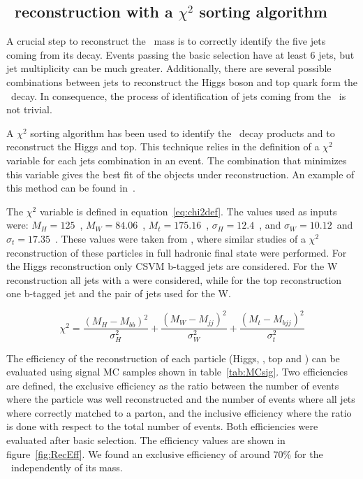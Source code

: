 \subsection{\Tp~reconstruction with a $\chi^{2}$ sorting algorithm}
\label{sec:chi2}

A crucial step to reconstruct the \Tp~mass is to correctly identify the five jets coming from its decay. Events passing the basic selection have at least 6 jets, but jet multiplicity can be much greater. Additionally, there are several possible combinations between jets to reconstruct the Higgs boson and top quark form the \Tp~decay. In consequence, the process of identification of jets coming from the \Tp~is not trivial. 

A $\chi^{2}$ sorting algorithm has been used to identify the \Tp~decay products and to reconstruct the Higgs and top. This technique relies in the definition of a $\chi^{2}$ variable for each jets combination in an event. The combination that minimizes this variable gives the best fit of the objects under reconstruction. An example of this method can be found in~\cite{Brochet:1956723}. 

The $\chi^{2}$ variable is defined in equation~\ref{eq:chi2def}. The values used as inputs were: $M_{H}=125$~\GeVcc, $M_{W}=84.06$~\GeVcc, $M_{t}=175.16$~\GeVcc, $\sigma_{H}=12.4$~\GeVcc, and $\sigma_{W}=10.12$~\GeVcc and $\sigma_{t}=17.35$~\GeVcc. These values were taken from \cite{Brochet:1956723,Chatrchyan:2013zna}, where similar studies of a $\chi^{2}$ reconstruction of these particles in full hadronic final state were performed. For the Higgs reconstruction only CSVM b-tagged jets are considered. For the W reconstruction all jets with a  were considered, while for the top reconstruction one b-tagged jet and the pair of jets used for the W. %

\begin{equation}
\chi^{2}=\frac{(M_{H}-M_{bb})^{2}}{\sigma_{H}^{2}}+\frac{(M_{W}-M_{jj})^{2}}{\sigma_{W}^{2}}+\frac{(M_{t}-M_{bjj})^{2}}{\sigma_{t}^{2}}
\label{eq:chi2def}
\end{equation}

The efficiency of the reconstruction of each particle (Higgs, \W, top and \Tp) can be evaluated using signal MC samples shown in table~\ref{tab:MCsig}. Two efficiencies are defined, the exclusive efficiency as the ratio between the number of events where the particle was well reconstructed and the number of events where all jets where correctly matched to a parton, and the inclusive efficiency where the ratio is done with respect to the total number of events. Both efficiencies were evaluated after basic selection. The efficiency values are shown in figure~\ref{fig:RecEff}. We found an exclusive efficiency of around 70\% for the \Tp~independently of its mass.

